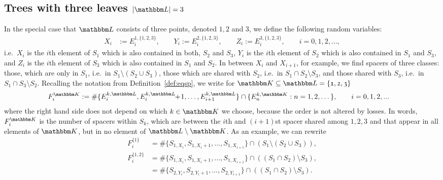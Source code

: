 \documentclass[preprint,authoryear]{elsarticle}
\theoremstyle{definition}
\numberwithin{equation}{section}
\numberwithin{figure}{section}
\begin{document}
\subsection[Trees with three leaves]{Trees with three leaves $|\mathbbm L|=3$}
In the special case that $\mathbbm L$ consists of three points,
denoted $\mathfrak 1, \mathfrak 2$ and $\mathfrak 3$, we define the
following random variables:
\begin{align*}
  X_i & := E_{i}^{\mathfrak 1, \{\mathfrak 1, \mathfrak 2, \mathfrak 3\}}, \qquad 
        Y_i := E_{i}^{\mathfrak 2, \{\mathfrak 1, \mathfrak 2, \mathfrak 3\}}, \qquad 
        Z_i := E_{i}^{\mathfrak 3, \{\mathfrak 1, \mathfrak 2, \mathfrak 3\}}, \qquad i=0,1,2,\dots,
\end{align*}
i.e.\ $X_i$ is the $i$th element of $S_{\mathfrak 1}$ which is also
contained in both, $S_{\mathfrak 2}$ and $S_{\mathfrak 3}$, $Y_i$ is
the $i$th element of $S_{\mathfrak 2}$ which is also contained in
$S_{\mathfrak 1}$ and $S_{\mathfrak 3}$, and $Z_i$ is the $i$th
element of $S_{\mathfrak 3}$ which is also contained in
$S_{\mathfrak 1}$ and $S_{\mathfrak 2}$. In between $X_i$ and
$X_{i+1}$, for example, we find spacers of three classes: those, which are
only in $S_{\mathfrak 1}$, i.e.\ in
$S_{\mathfrak 1} \setminus (S_{\mathfrak 2}\cup S_{\mathfrak 3})$,
those which are shared with $S_{\mathfrak 2}$, i.e.\ in
$S_{\mathfrak 1} \cap S_{\mathfrak 2} \setminus S_{\mathfrak 3}$, and
those shared with $S_{\mathfrak 3}$, i.e.\ in
$S_{\mathfrak 1} \cap S_{\mathfrak 3} \setminus S_{\mathfrak 2}$.
Recalling the notation from Definition~\ref{def:eqsp}, we write for
$\mathbbm K\subseteq\mathbbm L = \{\mathfrak 1, \mathfrak 2, \mathfrak
3\}$
\begin{align*}
  F_i^{\mathbbm K}
  & := \# \{E_i^{k, \mathbbm L},E_i^{k, \mathbbm L}\!\!+\!1,\dots,E_{i+1}^{k, \mathbbm L}\} \cap 
    \{E_n^{k, \mathbbm K}: n=1,2,\dots\}, \qquad i=0,1,2,...
\end{align*}
where the right hand side does not depend on which $k\in\mathbbm K$ we
choose, because the order is not altered by losses.
In words, $F_i^{\mathbbm K}$ is the number of spacers within
$S_k$, which are between the $i$th and $(i+1)$st spacer shared among
$\mathfrak 1, \mathfrak 2, \mathfrak 3$ and that appear in all elements of
$\mathbbm K$, but in no element of $\mathbbm L\setminus \mathbbm
K$. As an example, we can rewrite
\begin{align*}
  F_i^{\{\mathfrak 1\}} & =\# \{S_{\mathfrak 1, X_i},S_{\mathfrak 1, X_i+1},\dots,S_{\mathfrak 1, X_{i+1}}\} 
                          \cap (S_{\mathfrak 1} \setminus ( S_{\mathfrak 2} \cup S_{\mathfrak 3})),
  \\ 
  F_i^{\{\mathfrak 1,  \mathfrak 2\}} & = \# \{S_{\mathfrak 1, X_i},S_{\mathfrak 1, X_i+1},\dots,S_{\mathfrak 1, X_{i+1}}\} 
                                        \cap ((S_{\mathfrak 1} \cap S_{\mathfrak 2})\setminus S_{\mathfrak 3}),
  \\ & = \# \{S_{\mathfrak 2, Y_i},S_{\mathfrak 2, Y_i+1},\dots,S_{\mathfrak 2, Y_{i+1}}\} 
       \cap ((S_{\mathfrak 1} \cap S_{\mathfrak 2})\setminus S_{\mathfrak 3}).
\end{align*}
\end{document}
